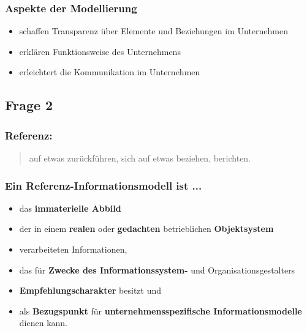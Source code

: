 \documentclass[a4paper]{article}
\newcommand{\tabitem}{~~\llap{\textbullet}~~}
\begin{document}
%

\hrulefill

\raggedright

\subsubsection*{Aspekte der Modellierung}
\begin{itemize}
	\item schaffen Transparenz über Elemente und Beziehungen im Unternehmen
	\item erklären Funktionsweise des Unternehmens
	\item erleichtert die Kommunikation im Unternehmen
\end{itemize}

\subsection*{Frage 2}
\label{le3-2}
\subsubsection*{Referenz:}
\begin{quote}
	auf etwas zurückführen, sich auf etwas beziehen, berichten.
\end{quote}
\subsubsection*{Ein Referenz-Informationsmodell ist ...}
\begin{itemize}
	\item das \textbf{immaterielle Abbild}
	\item der in einem \textbf{realen} oder \textbf{gedachten} betrieblichen \textbf{Objektsystem}
	\item verarbeiteten Informationen,
	\item das für \textbf{Zwecke des Informationssystem-} und Organisationsgestalters
	\item \textbf{Empfehlungscharakter} besitzt und
	\item als \textbf{Bezugspunkt} für \textbf{unternehmensspezifische Informationsmodelle} dienen kann.
\end{itemize}
\end{document}
